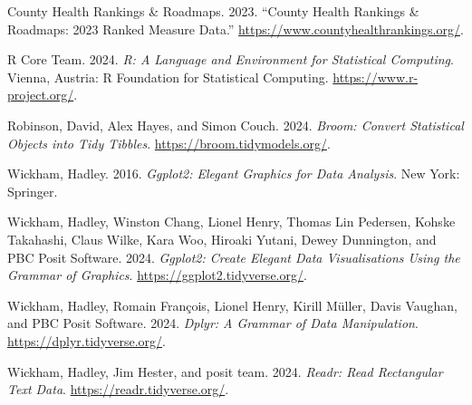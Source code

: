 \documentclass[
  letterpaper,
  DIV=11,
  numbers=noendperiod]{scrartcl}
\newlength{\cslhangindent}
\newenvironment{CSLReferences}[2] %
 {\begin{list}{}{%
  \setlength{\itemindent}{0pt}
  \setlength{\leftmargin}{0pt}
  \setlength{\parsep}{0pt}
  \ifodd #1
   \setlength{\leftmargin}{\cslhangindent}
   \setlength{\itemindent}{-1\cslhangindent}
  \fi
  \setlength{\itemsep}{#2\baselineskip}}}
 {\end{list}}
\begin{document}
\label{refs}
\begin{CSLReferences}{1}{0}
County Health Rankings \& Roadmaps. 2023. {``County Health Rankings \&
Roadmaps: 2023 Ranked Measure Data.''}
\url{https://www.countyhealthrankings.org/}.

R Core Team. 2024. \emph{R: A Language and Environment for Statistical
Computing}. Vienna, Austria: R Foundation for Statistical Computing.
\url{https://www.r-project.org/}.

Robinson, David, Alex Hayes, and Simon Couch. 2024. \emph{Broom: Convert
Statistical Objects into Tidy Tibbles}.
\url{https://broom.tidymodels.org/}.

Wickham, Hadley. 2016. \emph{Ggplot2: Elegant Graphics for Data
Analysis}. New York: Springer.

Wickham, Hadley, Winston Chang, Lionel Henry, Thomas Lin Pedersen,
Kohske Takahashi, Claus Wilke, Kara Woo, Hiroaki Yutani, Dewey
Dunnington, and PBC Posit Software. 2024. \emph{Ggplot2: Create Elegant
Data Visualisations Using the Grammar of Graphics}.
\url{https://ggplot2.tidyverse.org/}.

Wickham, Hadley, Romain François, Lionel Henry, Kirill Müller, Davis
Vaughan, and PBC Posit Software. 2024. \emph{Dplyr: A Grammar of Data
Manipulation}. \url{https://dplyr.tidyverse.org/}.

Wickham, Hadley, Jim Hester, and posit team. 2024. \emph{Readr: Read
Rectangular Text Data}. \url{https://readr.tidyverse.org/}.

\end{CSLReferences}
\end{document}
